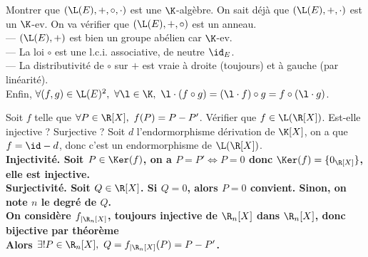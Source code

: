 \documentclass[11pt]{article}
\begin{document}
\vspace*{-0.7cm}

\begin{prop}{}{}
    Montrer que $(\L(E), +, \circ, \cdot)$ est une $\K$-algèbre.
    \tcblower
    On sait déjà que $(\L(E),+,\cdot)$ est un $\K$-ev. On va vérifier que $(\L(E),+,\circ)$ est un anneau.\\
    --- $(\L(E),+)$ est bien un groupe abélien car $\K$-ev.\\
    --- La loi $\circ$ est une l.c.i. associative, de neutre $\id_E$.\\
    --- La distributivité de $\circ$ sur $+$ est vraie à droite (toujours) et à gauche (par linéarité).\\
    Enfin, $\forall (f,g)\in\L(E)^2, ~ \forall \l \in \K, ~ \l\cdot(f\circ g)=(\l \cdot f)\circ g=f\circ(\l \cdot g)$.
\end{prop}

\vspace*{-0.7cm}

\begin{ex}{}{}
    Soit $f$ telle que $\forall P \in \R[X], ~ f(P)=P-P'$. Vérifier que $f\in\L(\R[X])$. Est-elle injective ? Surjective ?
    \tcblower
    Soit $d$ l'endormorphisme dérivation de $\K[X]$, on a que $f=\id-d$, donc c'est un endormorphisme de $\L(\R[X])$.\\
    \bf{Injectivité.} Soit $P\in\Ker(f)$, on a $P=P'\iff P=0$ donc $\Ker(f)=\{0_{\R[X]}\}$, elle est injective.\\
    \bf{Surjectivité.} Soit $Q\in\R[X]$. Si $Q=0$, alors $P=0$ convient. Sinon, on note $n$ le degré de $Q$.\\
    On considère $f_{|\R_n[X]}$, toujours injective de $\R_n[X]$ dans $\R_n[X]$, donc bijective par théorème\\
    Alors $\exists!P\in\R_n[X], ~ Q=f_{|\R_n[X]}(P)=P-P'$.
\end{ex}
\end{document}
